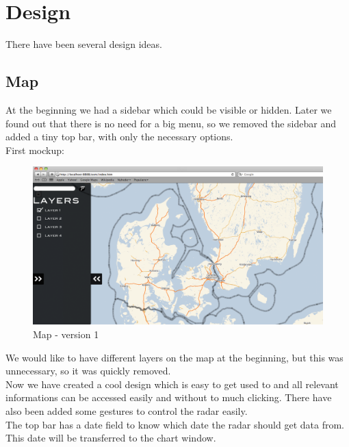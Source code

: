 \chapter{Design}
There have been several design ideas. 
\section{Map}
At the beginning we had a sidebar which could be visible or hidden. Later we found out that there is no need for a big menu, so we removed the sidebar and added a tiny top bar, with only the necessary options.\\
First mockup:\\
\begin{figure}[hbtp]
\includegraphics[scale=.5]{../figure/design_map_v1.png}
\caption{Map - version 1}
\end{figure}
We would like to have different layers on the map at the beginning, but this was unnecessary, so it was quickly removed.\\
Now we have created a cool design which is easy to get used to and all relevant informations can be accessed easily and without to much clicking.
There have also been added some gestures to control the radar easily.\\
The top bar has a date field to know which date the radar should get data from. This date will be transferred to the chart window.

